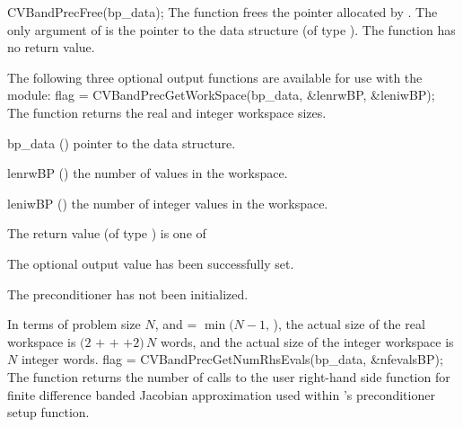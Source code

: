 {}
{
  CVBandPrecFree(bp\_data);
}
{
  The function  frees the pointer allocated by
  .
}
{
  The only argument of  is the pointer to the {\cvbandpre} 
  data structure (of type ).
}
{
  The function  has no return value.
}
{}


The following three optional output functions are available for use with 
the {\cvbandpre} module:
{
  flag = CVBandPrecGetWorkSpace(bp\_data, \&lenrwBP, \&leniwBP);
}
{
  The function  returns the
  {\cvbandpre} real and integer workspace sizes.
}
{
  \begin{args}[lenrwBP]
  \item[bp\_data] ()
    pointer to the {\cvbandpre} data structure.
  \item[lenrwBP] ()
    the number of  values in the {\cvbandpre} workspace.
  \item[leniwBP] ()
    the number of integer values in the {\cvbandpre} workspace.
  \end{args}
}
{
  The return value  (of type ) is one of
  \begin{args}
  \item[\Id{CV\_SUCCESS}] 
    The optional output value has been successfully set.
  \item[\Id{CV\_PDATA\_NULL}]
    The {\cvbandpre} preconditioner has not been initialized.
  \end{args}
}
{
  In terms of problem size $N$, and  = $\min(N-1,\,$),
  the actual size of the real workspace is
  $(2$  $+$  $+$  $+2)\, N$  words,
  and the actual size of the integer workspace is $N$ integer words.
}
{
  flag = CVBandPrecGetNumRhsEvals(bp\_data, \&nfevalsBP);
}
{
  The function  returns the
  number of calls to the user right-hand side function for
  finite difference banded Jacobian approximation used within
  {\cvbandpre}'s preconditioner setup function.
}
